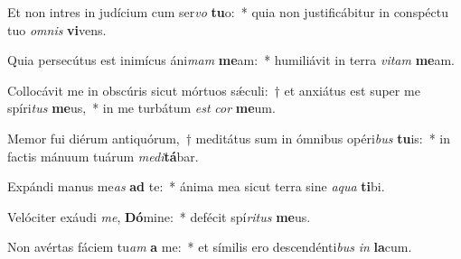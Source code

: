 \item Et non intres in judícium cum ser\textit{vo} \textbf{tu}o:~* quia non justificábitur in conspéctu tuo \textit{om}\textit{nis} \textbf{vi}vens.
\item Quia persecútus est inimícus áni\textit{mam} \textbf{me}am:~* humiliávit in terra \textit{vi}\textit{tam} \textbf{me}am.
\item Collocávit me in obscúris sicut mórtuos sǽculi:~† et anxiátus est super me spíri\textit{tus} \textbf{me}us,~* in me turbátum \textit{est} \textit{cor} \textbf{me}um.
\item Memor fui diérum antiquórum,~† meditátus sum in ómnibus opéri\textit{bus} \textbf{tu}is:~* in factis mánuum tuárum \textit{me}\textit{di}\textbf{tá}bar.
\item Expándi manus me\textit{as} \textbf{ad} te:~* ánima mea sicut terra sine \textit{a}\textit{qua} \textbf{ti}bi.
\item Velóciter exáudi \textit{me}, \textbf{Dó}mine:~* defécit spí\textit{ri}\textit{tus} \textbf{me}us.
\item Non avértas fáciem tu\textit{am} \textbf{a} me:~* et símilis ero descendénti\textit{bus} \textit{in} \textbf{la}cum.
